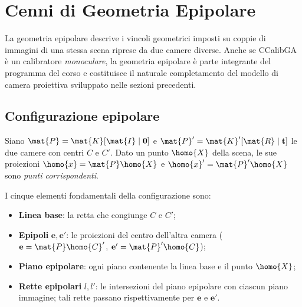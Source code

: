 \section{Cenni di Geometria Epipolare}
\label{sec:epipolare}

La geometria epipolare descrive i vincoli geometrici imposti su
coppie di immagini di una stessa scena riprese da due camere diverse.
Anche se CCalibGA è un calibratore \emph{monoculare}, la geometria
epipolare è parte integrante del programma del corso e costituisce il
naturale completamento del modello di camera proiettiva sviluppato
nelle sezioni precedenti.

\subsection{Configurazione epipolare}

Siano \(\mat{P}=\mat{K}[\mat{I}\mid\mathbf{0}]\) e
\(\mat{P}'=\mat{K}'[\mat{R}\mid\mathbf{t}]\) le due camere con
centri \(C\) e \(C'\).  Dato un punto \(\homo{X}\) della scena,
le sue proiezioni \(\homo{x}=\mat{P}\homo{X}\) e
\(\homo{x}'=\mat{P}'\homo{X}\) sono \emph{punti corrispondenti}.

I cinque elementi fondamentali della configurazione sono:
\begin{itemize}
  \item \textbf{Linea base}: la retta che congiunge \(C\) e \(C'\);
  \item \textbf{Epipoli} \(\mathbf{e},\mathbf{e}'\): le proiezioni del
        centro dell'altra camera
        (\(\mathbf{e}=\mat{P}\homo{C}'\),
        \(\mathbf{e}'=\mat{P}'\homo{C}\));
  \item \textbf{Piano epipolare}: ogni piano contenente la linea base
        e il punto \(\homo{X}\);
  \item \textbf{Rette epipolari} \(l,l'\): le intersezioni del piano
        epipolare con ciascun piano immagine; tali rette passano
        rispettivamente per \(\mathbf{e}\) e \(\mathbf{e}'\).
\end{itemize}

